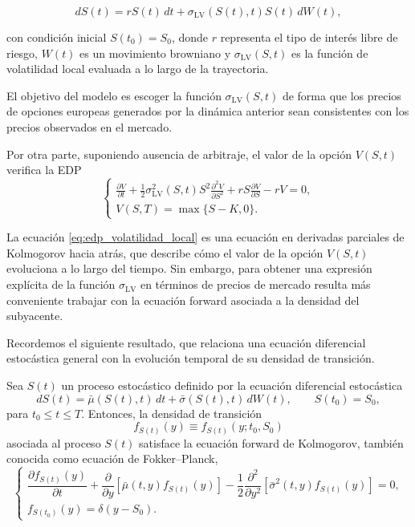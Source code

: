 \[
dS(t) = rS(t)\,dt + \sigma_{\mathrm{LV}}(S(t),t)S(t)\,dW(t),
\]

con condición inicial \(S(t_0)=S_0\), donde \(r\) representa el tipo de interés libre de riesgo, \(W(t)\) es un movimiento browniano y \(\sigma_{\mathrm{LV}}(S,t)\) es la función de volatilidad local evaluada a lo largo de la trayectoria.\medskip

El objetivo del modelo es escoger la función $\sigma_{\mathrm{LV}}(S,t)$ de forma que los precios de opciones europeas generados por la dinámica anterior sean consistentes con los precios observados en el mercado. 

Por otra parte, suponiendo ausencia de arbitraje, el valor de la opción \(V(S,t)\) verifica la EDP
\begin{equation}
\label{eq:edp_volatilidad_local}
   \begin{cases}
    \frac{\partial V}{\partial t} + \frac{1}{2}\sigma^2_{\mathrm{LV}}(S,t) S^2 \frac{\partial^2 V}{\partial S^2} + r S \frac{\partial V}{\partial S} - rV = 0, \\
    V(S,T) = \max\{S-K,0\}. 
\end{cases} 
\end{equation}

La ecuación \ref{eq:edp_volatilidad_local} es una ecuación en derivadas parciales de Kolmogorov hacia atrás, que describe cómo el valor de la opción \(V(S,t)\) evoluciona a lo largo del tiempo. Sin embargo, para obtener una expresión explícita de la función \(\sigma_{\mathrm{LV}}\) en términos de precios de mercado resulta más conveniente trabajar con la ecuación forward asociada a la densidad del subyacente. \medskip

Recordemos el siguiente resultado, que relaciona una ecuación diferencial estocástica general con la evolución temporal de su densidad de transición.

\begin{theorem}
Sea $S(t)$ un proceso estocástico definido por la ecuación diferencial estocástica
\[
dS(t)=\bar{\mu}(S(t),t)\,dt+\bar{\sigma}(S(t),t)\,dW(t),
\qquad S(t_0)=S_0,
\]
para $t_0\leq t\leq T$. Entonces, la densidad de transición
\[
f_{S(t)}(y)\equiv f_{S(t)}(y;t_0,S_0)
\]
asociada al proceso $S(t)$ satisface la ecuación forward de Kolmogorov, también conocida como ecuación de Fokker--Planck,
\begin{equation}
\begin{cases}
\dfrac{\partial f_{S(t)}(y)}{\partial t}
+\dfrac{\partial}{\partial y}\left[\bar{\mu}(t,y)f_{S(t)}(y)\right]
-\dfrac{1}{2}\dfrac{\partial^2}{\partial y^2}
\left[\bar{\sigma}^2(t,y)f_{S(t)}(y)\right]=0, \\[0.3cm]
f_{S(t_0)}(y)=\delta(y-S_0).
\end{cases}
\label{eq:fokker_planck}
\end{equation}
\end{theorem}

